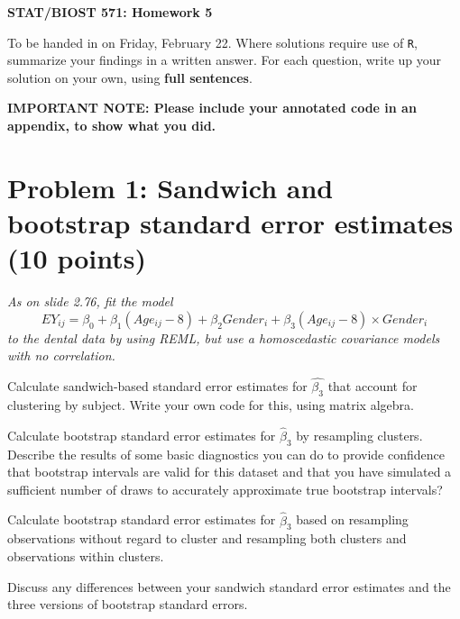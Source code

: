 \documentclass[11pt, letterpaper]{article}
\begin{document}
\Large 
\begin{center}
\bf STAT/BIOST 571: Homework 5
\end{center} 
\normalsize 

To be handed in on Friday, February 22. 
Where solutions require use of \texttt{R}, summarize your findings in a written answer. For each question, write up your solution on your own, using \textbf{full sentences}.

\textbf{IMPORTANT NOTE: Please include your annotated code in an appendix, to show what you did.}
\section*{Problem 1: Sandwich and bootstrap standard error estimates (10 points)}
{\em As on slide 2.76, fit the model
\[
EY_{ij}=\beta_0 +\beta_1(Age_{ij}-8)+\beta_2 Gender_i + \beta_3(Age_{ij} -8)\times Gender _i
\]
to the dental data by using REML, but use a homoscedastic covariance models with no correlation.}
\begin{enumerate}[(a)]
{\em \item Calculate sandwich-based standard error estimates for $\hat{\beta_3}$ that account for clustering by subject.  Write your
own code for this, using matrix algebra.}
{\em \item Calculate bootstrap standard error estimates 
for $\hat{\beta}_3$ by resampling clusters.  Describe the results of some basic diagnostics you can do to provide confidence that
bootstrap intervals are valid for this dataset and that you have simulated a sufficient number 
of draws to accurately approximate true bootstrap intervals?}
{ \em \item Calculate bootstrap standard error estimates for $\hat{\beta}_3$ based on resampling observations
without regard to cluster and resampling both clusters and observations within clusters. }
{\em \item Discuss any differences between your sandwich standard error estimates and the three versions of bootstrap standard errors.}
\end{enumerate} 
\end{document}
